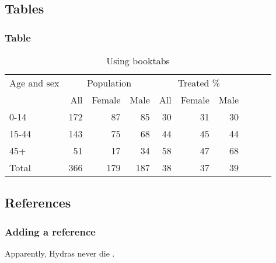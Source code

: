 \documentclass[aspectratio=169]{beamer}
\begin{document}
\subsection{Tables}
\begin{frame}[mpidrbackground=2]
    \frametitle{Table}
	
\begin{table}
\caption{Using booktabs}
\begin{tabular}{lrrrrrrrrr}
\toprule
\multicolumn{1}{c}{Age and sex} & \multicolumn{3}{c}{Population} & \multicolumn{3}{c}{Treated \%} \\
\cmidrule(l{3pt}r{3pt}){1-1} \cmidrule(l{3pt}r{3pt}){2-4} \cmidrule(l{3pt}r{3pt}){5-7} 
  & All & Female & Male & All  & Female  & Male   \\
\midrule
0-14 & 172 & 87 & 85 & 30 & 31 & 30 \\
15-44 & 143 & 75 & 68 & 44 & 45 & 44 \\
45+ & 51 & 17 & 34 & 58 & 47 & 68 \\
Total & 366 & 179 & 187 & 38 & 37 & 39 \\
\bottomrule
\end{tabular}
\end{table}	
	
\end{frame}

\subsection{References}
\begin{frame}[mpidrbackground=2]
    \frametitle{Adding a reference}
	
Apparently, Hydras never die \cite{Schaible15701}.
	
\end{frame}


\end{document}

